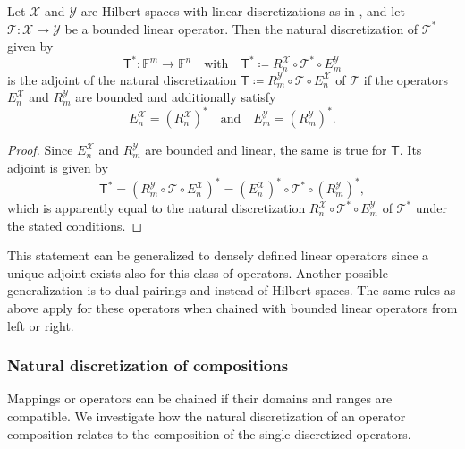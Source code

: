 \documentclass[a4paper]{paper}
\newcommand*{\SPC}[1]{{\ensuremath{\mathscr{#1}}}}
\newcommand*{\SPCX}{\SPC{X}}
\newcommand*{\SPCY}{\SPC{Y}}
\newcommand{\FIELD}{{\ensuremath{\mathbb{F}}}}
\newcommand*{\Fn}{{\ensuremath{\FIELD^n}}}
\newcommand*{\Fm}{{\ensuremath{\FIELD^m}}}
\newcommand*{\OP}[1]{{\ensuremath{\mathcal{#1}}}}
\newcommand*{\OPT}{\OP{T}}
\newcommand{\DISCOP}[1]{{\ensuremath{\mathsf{#1}}}}
\newcommand*{\DISCOPT}{\DISCOP{T}}
\newcommand*{\EXT}[2]{\ensuremath{E_{#1}^{#2}}}
\newcommand*{\REST}[2]{\ensuremath{R_{#1}^{#2}}}
\newcommand*{\RnX}{{\ensuremath{\REST{n}{\SPC{X}}}}}
\newcommand*{\RmY}{{\ensuremath{\REST{m}{\SPC{Y}}}}}
\newcommand*{\EnX}{{\ensuremath{\EXT{n}{\SPC{X}}}}}
\newcommand*{\EmY}{{\ensuremath{\EXT{m}{\SPC{Y}}}}}
\begin{document}
\begin{lemma}
 \label{lemma:discr:operator:op_adj:natural_is_adj}
 Let $\SPCX$ and $\SPCY$ are Hilbert spaces with linear discretizations as in 
 , and let $\OPT \colon \SPCX \to \SPCY$ be a bounded linear operator. 
 Then the natural discretization of $\OPT^*$ given by
 \begin{equation*}
  \DISCOPT^* \colon \Fm \to \Fn
  \quad \text{with} \quad
  \DISCOPT^* \coloneqq  \RnX \circ \OPT^* \circ \EmY
 \end{equation*}
 is the adjoint of the natural discretization $\DISCOPT \coloneqq  \RmY \circ \OPT \circ \EnX$ of $\OPT$ if the 
operators 
 $\EnX$ and $\RmY$ are bounded and additionally satisfy
 \begin{equation*}
  \EnX = (\RnX)^* \quad \text{and} \quad \EmY = (\RmY)^*.
 \end{equation*}
\end{lemma}
\vspace{1em}


\begin{proof}
 Since $\EnX$ and $\RmY$ are bounded and linear, the same is true for $\DISCOPT$. Its adjoint is given by
 \begin{equation*}
  \DISCOPT^* = (\RmY \circ \OPT \circ \EnX)^* = (\EnX)^* \circ \OPT^* \circ (\RmY)^*,
 \end{equation*}
 which is apparently equal to the natural discretization $\RnX \circ \OPT^* \circ \EmY$ of $\OPT^*$ under the 
 stated conditions.
\end{proof}

\begin{remark}
 This statement can be generalized to densely defined linear operators since a unique adjoint exists also for this 
 class of operators. Another possible generalization is to dual pairings and instead of Hilbert spaces. The same rules 
 as above apply for these operators when chained with bounded linear operators from left or right.
\end{remark}


\subsubsection{Natural discretization of compositions}
\label{subsubsec:discr:operator:op_comp}

Mappings or operators can be chained if their domains and ranges are compatible. We investigate how the natural 
discretization of an operator composition relates to the composition of the single discretized operators.
\end{document}
